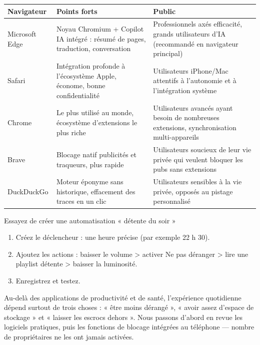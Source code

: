 \begin{center}
\begin{tabularx}{\linewidth}{|X|X|X|}
\hline
\textbf{Navigateur} & \textbf{Points forts} & \textbf{Public} \tabularnewline
\hline
Microsoft Edge & Noyau Chromium + Copilot IA intégré : résumé de pages, traduction, conversation & Professionnels axés efficacité, grands utilisateurs d'IA (recommandé en navigateur principal) \tabularnewline
Safari & Intégration profonde à l'écosystème Apple, économe, bonne confidentialité & Utilisateurs iPhone/Mac attentifs à l'autonomie et à l'intégration système \tabularnewline
Chrome & Le plus utilisé au monde, écosystème d'extensions le plus riche & Utilisateurs avancés ayant besoin de nombreuses extensions, synchronisation multi-appareils \tabularnewline
Brave & Blocage natif publicités et traqueurs, plus rapide & Utilisateurs soucieux de leur vie privée qui veulent bloquer les pubs sans extensions \tabularnewline
DuckDuckGo & Moteur éponyme sans historique, effacement des traces en un clic & Utilisateurs sensibles à la vie privée, opposés au pistage personnalisé \tabularnewline
\hline
\end{tabularx}
\end{center}

\begin{tcbpractice}{Essayez de créer une automatisation « détente du soir »}
\begin{enumerate}
  \item Créez le déclencheur : une heure précise (par exemple 22 h 30).
  \item Ajoutez les actions : baisser le volume > activer Ne pas déranger > lire une playlist détente > baisser la luminosité.
  \item Enregistrez et testez.
\end{enumerate}

\end{tcbpractice}


Au-delà des applications de productivité et de santé, l'expérience quotidienne dépend surtout de trois choses : « être moins dérangé », « avoir assez d'espace de stockage » et « laisser les escrocs dehors ». Nous passons d'abord en revue les logiciels pratiques, puis les fonctions de blocage intégrées au téléphone — nombre de propriétaires ne les ont jamais activées.


